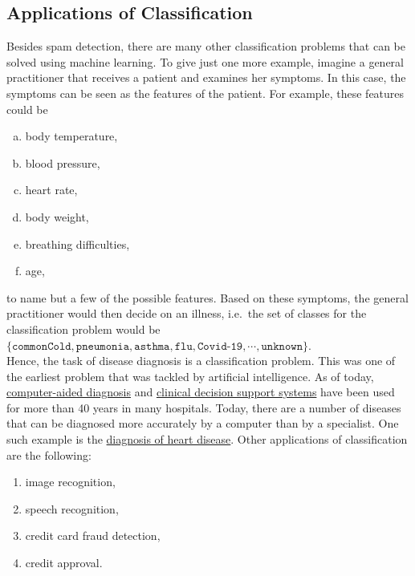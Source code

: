 \subsection{Applications of Classification}
Besides spam detection, there are many other classification problems that can be solved using machine learning.  To give
just one more example, imagine a general practitioner that receives a patient and examines her symptoms.  In this case,
the symptoms can be seen as the features of the patient.  For example, these features could be
\begin{enumerate}[(a)]
\item body temperature,
\item blood pressure,
\item heart rate,
\item body weight,
\item breathing difficulties,
\item age,
\end{enumerate}
to name but a few of the possible features.  Based on these symptoms, the general practitioner would then decide on an
illness, i.e.~the set of classes for the classification problem would be
\\[0.2cm]
\hspace*{1.3cm}
$\{ \mathtt{commonCold}, \mathtt{pneumonia}, \mathtt{asthma}, \mathtt{flu}, \texttt{Covid-19}, \cdots, \mathtt{unknown} \}$.
\\[0.2cm]
Hence, the task of disease diagnosis is a classification problem.  This was one of the earliest problem that was tackled
by artificial intelligence.  As of today, 
\href{https://en.wikipedia.org/wiki/Computer-aided_diagnosis}{computer-aided diagnosis} and 
\href{https://en.wikipedia.org/wiki/Clinical_decision_support_system}{clinical decision support systems}
have been used for more than 40 years in many hospitals.  Today, there are a number of diseases that can be
diagnosed more accurately by a computer than by a specialist.  One such example is the
\href{http://www.ultromics.com}{diagnosis of heart disease}.  Other applications of classification are the following:
\begin{enumerate}
\item image recognition,
\item speech recognition,
\item credit card fraud detection,
\item credit approval.
\end{enumerate}


